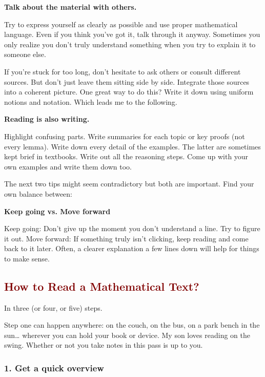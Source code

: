 \documentclass[paper=a4, fontsize=12pt]{scrartcl} %
\begin{document}
\medskip
\noindent
\textbf{Talk about the material with others.}

Try to express yourself as clearly as possible and use proper mathematical language. Even if you think you’ve got it, talk through it anyway. Sometimes you only realize you don’t truly understand something when you try to explain it to someone else.

If you’re stuck for too long, don’t hesitate to ask others or consult different sources. But don’t just leave them sitting side by side. Integrate those sources into a coherent picture. One great way to do this? Write it down using uniform notions and notation. Which leads me to the following.  

\medskip
\noindent
\textbf{Reading is also writing.}

Highlight confusing parts. Write summaries for each topic or key proofs (not every lemma). Write down every detail of the examples. The latter are sometimes kept brief in textbooks. Write out all the reasoning steps. Come up with your own examples and write them down too.

\bigskip

The next two tips might seem contradictory but both are important. Find your own balance between:

\medskip
\noindent
\textbf{Keep going vs. Move forward}

Keep going: Don’t give up the moment you don’t understand a line. Try to figure it out.  
Move forward: If something truly isn’t clicking, keep reading and come back to it later. Often, a clearer explanation a few lines down will help for things to make sense.

\subsection*{\textcolor{Maroon}{How to Read a Mathematical Text?}}

In three (or four, or five) steps.

\medskip
\noindent
Step one can happen anywhere: on the couch, on the bus, on a park bench in the sun… wherever you can hold your book or device. My son loves reading on the swing. Whether or not you take notes in this pass is up to you.

\subsubsection*{1. Get a quick overview}
\end{document}
